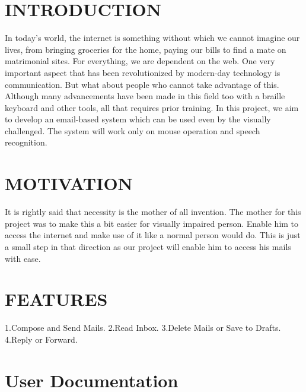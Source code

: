 \documentclass[12pt]{article}
\begin{document}
\section{INTRODUCTION}
In today's world, the internet is something without which we cannot imagine our lives, from bringing groceries for the home, paying our bills to find a mate on matrimonial sites. For everything, we are dependent on the web. One very important aspect that has been revolutionized by modern-day technology is communication.  But what about people who cannot take advantage of this. Although many advancements have been made in this field too with a braille keyboard and other tools, all that requires prior training. In this project, we aim to develop an email-based system which can be used even by the visually challenged. The system will work only on mouse operation and speech recognition.


\section{MOTIVATION}
It is rightly said that necessity is the mother of all invention. The mother for this project was to make this a bit easier for visually impaired person. Enable him to access the internet and make use of it like a normal person would do. This is just a small step in that direction as our project will enable him to access his mails with ease.

\section{FEATURES}
1.Compose and Send Mails.\newline
2.Read Inbox.\newline
3.Delete Mails or Save to Drafts.\newline
4.Reply or Forward.
\pagebreak
\section{User Documentation}
\end{document}
